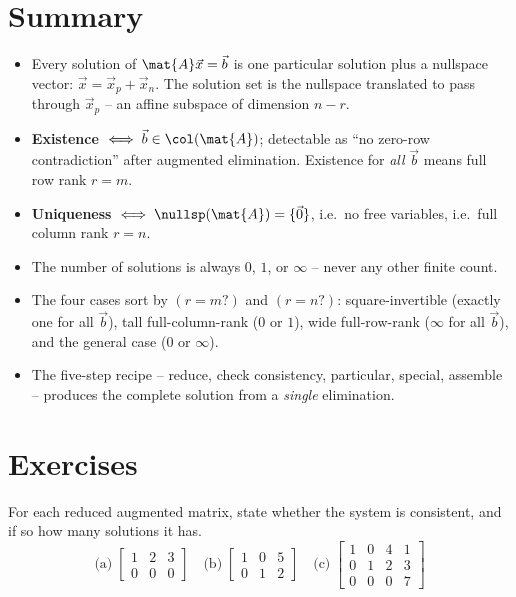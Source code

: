\section{Summary}

\begin{itemize}
  \item Every solution of $\mat{A}\vec{x}=\vec{b}$ is one particular solution plus a
    nullspace vector: $\vec{x}=\vec{x}_p+\vec{x}_n$. The solution set is the nullspace
    translated to pass through $\vec{x}_p$ -- an affine subspace of dimension $n-r$.
  \item \textbf{Existence} $\iff \vec{b}\in\col(\mat{A})$; detectable as ``no zero-row
    contradiction'' after augmented elimination. Existence for \emph{all} $\vec{b}$ means
    full row rank $r=m$.
  \item \textbf{Uniqueness} $\iff \nullsp(\mat{A})=\{\vec{0}\}$, i.e.\ no free variables,
    i.e.\ full column rank $r=n$.
  \item The number of solutions is always $0$, $1$, or $\infty$ -- never any other finite
    count.
  \item The four cases sort by $(r=m?)$ and $(r=n?)$: square-invertible (exactly one for
    all $\vec b$), tall full-column-rank ($0$ or $1$), wide full-row-rank ($\infty$ for
    all $\vec b$), and the general case ($0$ or $\infty$).
  \item The five-step recipe -- reduce, check consistency, particular, special, assemble --
    produces the complete solution from a \emph{single} elimination.
\end{itemize}

\section{Exercises}

\begin{exercise}
\label{ch13:ex-verdict}
For each reduced augmented matrix, state whether the system is consistent, and if so how
many solutions it has.
\[
\text{(a)}\;\left[\begin{array}{cc|c}1&2&3\\0&0&0\end{array}\right]\quad
\text{(b)}\;\left[\begin{array}{cc|c}1&0&5\\0&1&2\end{array}\right]\quad
\text{(c)}\;\left[\begin{array}{ccc|c}1&0&4&1\\0&1&2&3\\0&0&0&7\end{array}\right]
\]
\end{exercise}

